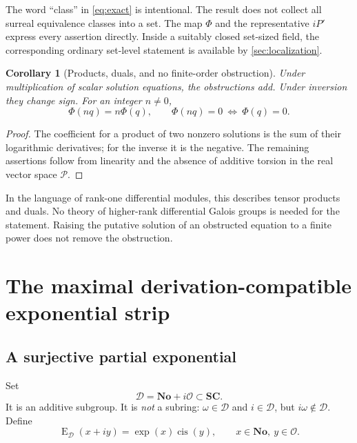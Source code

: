 \documentclass[11pt,letterpaper]{article}
\numberwithin{equation}{section}
\newtheorem{corollary}[corollary]{Corollary}
\theoremstyle{definition}
\theoremstyle{remark}
\newcommand{\No}{\mathbf{No}}
\newcommand{\SC}{\mathbf{SC}}
\newcommand{\OO}{\mathcal O}
\newcommand{\PPi}{\mathcal P}
\newcommand{\DD}{\mathcal D}
\newcommand{\cis}{\operatorname{cis}}
\newcommand{\Ed}{\operatorname{E}_{\DD}}
\begin{document}
The word ``class'' in \eqref{eq:exact} is intentional. The result does not collect all surreal equivalence classes into a set. The map $\Phi$ and the representative $iP'$ express every assertion directly. Inside a suitably closed set-sized field, the corresponding ordinary set-level statement is available by \cref{sec:localization}.

\begin{corollary}[Products, duals, and no finite-order obstruction]\label{cor:tensor}
Under multiplication of scalar solution equations, the obstructions add. Under inversion they change sign. For an integer $n\ne0$,
\[
 \Phi(nq)=n\Phi(q),\qquad
 \Phi(nq)=0\ \Longleftrightarrow\ \Phi(q)=0.
\]
\end{corollary}
\begin{proof}
The coefficient for a product of two nonzero solutions is the sum of their logarithmic derivatives; for the inverse it is the negative. The remaining assertions follow from linearity and the absence of additive torsion in the real vector space $\PPi$.
\end{proof}

In the language of rank-one differential modules, this describes tensor products and duals. No theory of higher-rank differential Galois groups is needed for the statement. Raising the putative solution of an obstructed equation to a finite power does not remove the obstruction.

\section{The maximal derivation-compatible exponential strip}\label{sec:strip}

\subsection{A surjective partial exponential}
Set
\[
 \DD=\No+i\OO\subset\SC.
\]
It is an additive subgroup. It is \emph{not} a subring: $\omega\in\DD$ and $i\in\DD$, but $i\omega\notin\DD$. Define
\begin{equation}\label{eq:stripExp}
 \Ed(x+iy)=\exp(x)\cis(y),\qquad x\in\No,\ y\in\OO.
\end{equation}
\end{document}

